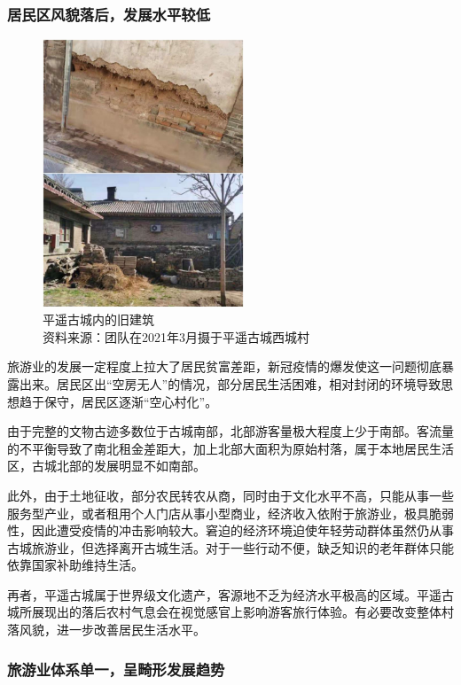 \documentclass[UTF8]{ctexart}
\begin{document}
        \subsubsection{居民区风貌落后，发展水平较低}
        \begin{figure}[H]
        \centering
        \includegraphics[width=6cm]{建筑.jpg}
        \caption[plain]{平遥古城内的旧建筑\\资料来源：团队在2021年3月摄于平遥古城西城村}
        \label{fig:my_label}
        \end{figure}
        旅游业的发展一定程度上拉大了居民贫富差距，新冠疫情的爆发使这一问题彻底暴露出来。居民区出“空房无人”的情况，部分居民生活困难，相对封闭的环境导致思想趋于保守，居民区逐渐“空心村化”。
        
        由于完整的文物古迹多数位于古城南部，北部游客量极大程度上少于南部。客流量的不平衡导致了南北租金差距大，加上北部大面积为原始村落，属于本地居民生活区，古城北部的发展明显不如南部。
        
        此外，由于土地征收，部分农民转农从商，同时由于文化水平不高，只能从事一些服务型产业，或者租用个人门店从事小型商业，经济收入依附于旅游业，极具脆弱性，因此遭受疫情的冲击影响较大。窘迫的经济环境迫使年轻劳动群体虽然仍从事古城旅游业，但选择离开古城生活。对于一些行动不便，缺乏知识的老年群体只能依靠国家补助维持生活。
        
        再者，平遥古城属于世界级文化遗产，客源地不乏为经济水平极高的区域。平遥古城所展现出的落后农村气息会在视觉感官上影响游客旅行体验。有必要改变整体村落风貌，进一步改善居民生活水平。
        
        \subsubsection{旅游业体系单一，呈畸形发展趋势}
        
\end{document}
